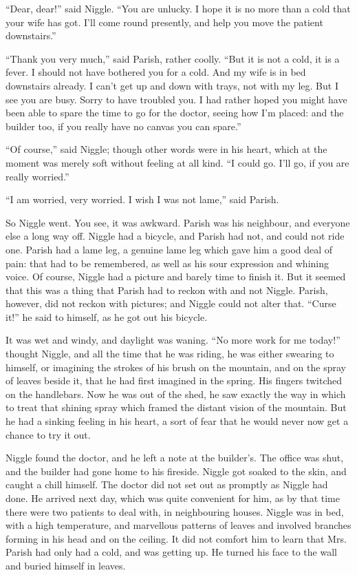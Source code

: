 \documentclass[english]{scrartcl}
\begin{document}
“Dear, dear!” said Niggle. “You are unlucky. I hope it is no more than a cold that your wife has got. I’ll come round presently, and help you move the patient downstairs.”

“Thank you very much,” said Parish, rather coolly. “But it is not a cold, it is a fever. I should not have bothered you for a cold. And my wife is in bed downstairs already. I can’t get up and down with trays, not with my leg. But I see you are busy. Sorry to have troubled you. I had rather hoped you might have been able to spare the time to go for the doctor, seeing how I’m placed: and the builder too, if you really have no canvas you can spare.”

“Of course,” said Niggle; though other words were in his heart, which at the moment was merely soft without feeling at all kind. “I could go. I’ll go, if you are really worried.”

“I am worried, very worried. I wish I was not lame,” said Parish.

So Niggle went. You see, it was awkward. Parish was his neighbour, and everyone else a long way off. Niggle had a bicycle, and Parish had not, and could not ride one. Parish had a lame leg, a genuine lame leg which gave him a good deal of pain: that had to be remembered, as well as his sour expression and whining voice. Of course, Niggle had a picture and barely time to finish it. But it seemed that this was a thing that Parish had to reckon with and not Niggle. Parish, however, did not reckon with pictures; and Niggle could not alter that. “Curse it!” he said to himself, as he got out his bicycle.

It was wet and windy, and daylight was waning. “No more work for me today!” thought Niggle, and all the time that he was riding, he was either swearing to himself, or imagining the strokes of his brush on the mountain, and on the spray of leaves beside it, that he had first imagined in the spring. His fingers twitched on the handlebars. Now he was out of the shed, he saw exactly the way in which to treat that shining spray which framed the distant vision of the mountain. But he had a sinking feeling in his heart, a sort of fear that he would never now get a chance to try it out.

Niggle found the doctor, and he left a note at the builder’s. The office was shut, and the builder had gone home to his fireside. Niggle got soaked to the skin, and caught a chill himself. The doctor did not set out as promptly as Niggle had done. He arrived next day, which was quite convenient for him, as by that time there were two patients to deal with, in neighbouring houses. Niggle was in bed, with a high temperature, and marvellous patterns of leaves and involved branches forming in his head and on the ceiling. It did not comfort him to learn that Mrs. Parish had only had a cold, and was getting up. He turned his face to the wall and buried himself in leaves.
\end{document}
